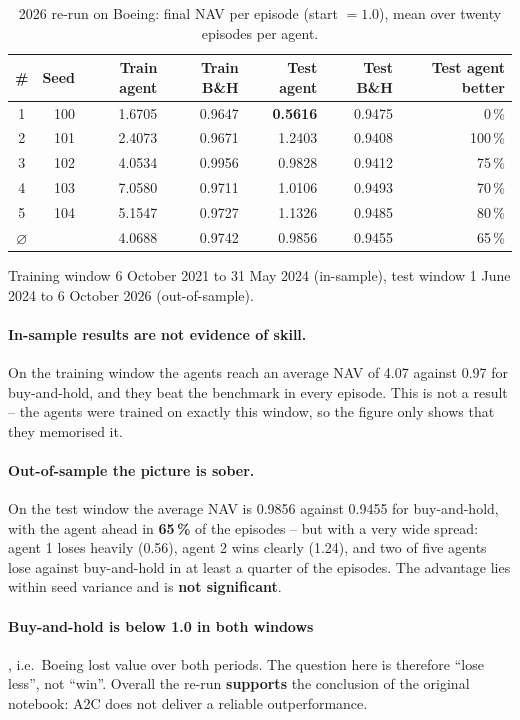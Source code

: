 \begin{table}[H]
  \centering
  \caption{2026 re-run on Boeing: final NAV per episode (start $=1.0$), mean over
  twenty episodes per agent.}
  \label{tab:update-a2c}
  \begin{tabular}{crrr|rrr}
    \toprule
    \# & Seed & Train agent & Train B\&H & Test agent & Test B\&H & Test agent better\\
    \midrule
    1 & 100 & 1.6705 & 0.9647 & \textbf{0.5616} & 0.9475 & 0\,\%\\
    2 & 101 & 2.4073 & 0.9671 & 1.2403 & 0.9408 & 100\,\%\\
    3 & 102 & 4.0534 & 0.9956 & 0.9828 & 0.9412 & 75\,\%\\
    4 & 103 & 7.0580 & 0.9711 & 1.0106 & 0.9493 & 70\,\%\\
    5 & 104 & 5.1547 & 0.9727 & 1.1326 & 0.9485 & 80\,\%\\
    \midrule
    $\varnothing$ & & 4.0688 & 0.9742 & 0.9856 & 0.9455 & 65\,\%\\
    \bottomrule
  \end{tabular}
\end{table}

Training window 6 October 2021 to 31 May 2024 (in-sample), test window 1 June 2024 to
6 October 2026 (out-of-sample).

\paragraph{In-sample results are not evidence of skill.} On the training window the agents
reach an average NAV of 4.07 against 0.97 for buy-and-hold, and they beat the benchmark in
every episode. This is not a result -- the agents were trained on exactly this window, so the
figure only shows that they memorised it.

\paragraph{Out-of-sample the picture is sober.} On the test window the average NAV is 0.9856
against 0.9455 for buy-and-hold, with the agent ahead in \textbf{65\,\%} of the episodes --
but with a very wide spread: agent 1 loses heavily (0.56), agent 2 wins clearly (1.24), and
two of five agents lose against buy-and-hold in at least a quarter of the episodes. The
advantage lies within seed variance and is \textbf{not significant}.

\paragraph{Buy-and-hold is below 1.0 in both windows}, i.e.\ Boeing lost value over both
periods. The question here is therefore ``lose less'', not ``win''. Overall the re-run
\textbf{supports} the conclusion of the original notebook: A2C does not deliver a reliable
outperformance.

